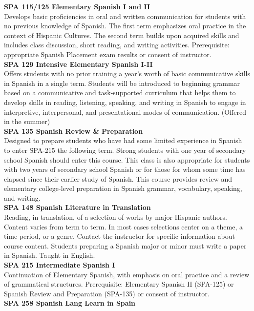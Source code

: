 \documentclass[
  letterpaper,
]{scrbook}
\begin{document}
\textbf{SPA 115/125 Elementary Spanish I and II}\\
Develops basic proficiencies in oral and written communication for
students with no previous knowledge of Spanish. The first term
emphasizes oral practice in the context of Hispanic Cultures. The second
term builds upon acquired skills and includes class discussion, short
reading, and writing activities. Prerequisite: appropriate Spanish
Placement exam results or consent of instructor.\\
\textbf{SPA 129 Intensive Elementary Spanish I-II}\\
Offers students with no prior training a year's worth of basic
communicative skills in Spanish in a single term. Students will be
introduced to beginning grammar based on a communicative and
task-supported curriculum that helps them to develop skills in reading,
listening, speaking, and writing in Spanish to engage in interpretive,
interpersonal, and presentational modes of communication. (Offered in
the summer)\\
\textbf{SPA 135 Spanish Review \& Preparation}\\
Designed to prepare students who have had some limited experience in
Spanish to enter SPA-215 the following term. Strong students with one
year of secondary school Spanish should enter this course. This class is
also appropriate for students with two years of secondary school Spanish
or for those for whom some time has elapsed since their earlier study of
Spanish. This course provides review and elementary college-level
preparation in Spanish grammar, vocabulary, speaking, and writing.\\
\textbf{SPA 148 Spanish Literature in Translation}\\
Reading, in translation, of a selection of works by major Hispanic
authors. Content varies from term to term. In most cases selections
center on a theme, a time period, or a genre. Contact the instructor for
specific information about course content. Students preparing a Spanish
major or minor must write a paper in Spanish. Taught in English.\\
\textbf{SPA 215 Intermediate Spanish I}\\
Continuation of Elementary Spanish, with emphasis on oral practice and a
review of grammatical structures. Prerequisite: Elementary Spanish II
(SPA-125) or Spanish Review and Preparation (SPA-135) or consent of
instructor.\\
\textbf{SPA 258 Spanish Lang Learn in Spain}\\
\end{document}
